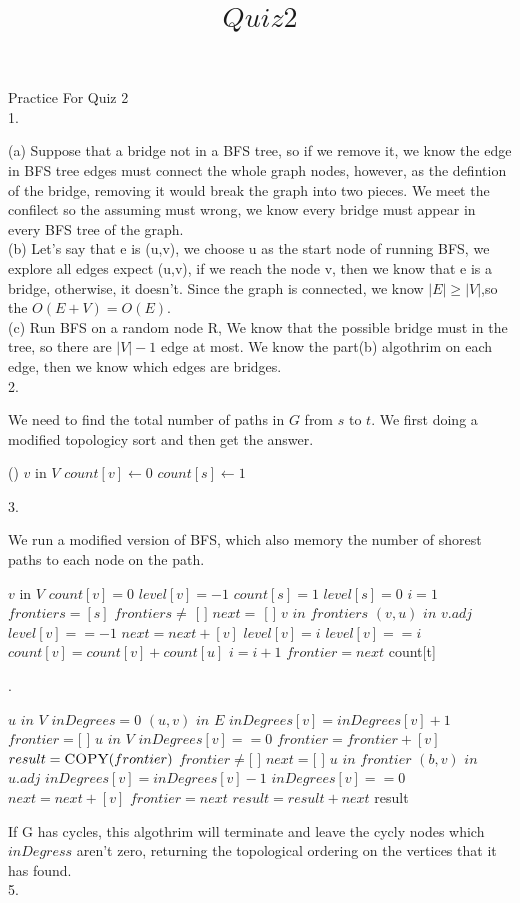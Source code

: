 \documentclass[12pt,twoside]{article}
\begin{document}
\title{$Quiz 2$}
Practice For Quiz 2\\
1.

(a) Suppose that a bridge not in a BFS tree, so if we remove it, we know the edge in BFS tree edges must connect the whole graph nodes, however, as the defintion of the bridge, removing it would break the graph into two pieces. We meet the confilect so the assuming must wrong, we know every bridge must appear in every BFS tree of the graph.\\
(b) Let's say that e is (u,v), we choose u as the start node of running BFS, we explore all edges expect (u,v), if we reach the node v, then we know that e is a bridge, otherwise, it doesn't. Since the graph is connected, we know $|E| \geq |V|$,so the $O(E+V)=O(E)$. \\
(c) Run BFS on a random node R, We know that the possible bridge must in the tree, so there are $|V|-1$ edge at most. We know the part(b) algothrim on each edge, then we know which edges are bridges.\\
2.

We need to find the total number of paths in $G$ from $s$ to $t$. We first doing a modified topologicy sort and then get the answer.
\begin{codebox}
\li {}()
\li \For $v$ in $V$ \Do
\li $count[v] \gets 0$ \End
\li $count[s] \gets 1$
\li 
\end{codebox}
\newpage

3.

We run a modified version of BFS, which also memory the number of shorest paths to each node on the path.
\begin{codebox}
\li \For $v$ in $V$ \Do
\li $count[v]=0$ 
\li $level[v]=-1$\End
\li $count[s]=1$
\li $level[s]=0$
\li $i=1$
\li $frontiers=[s]$
\li 
\li \While $frontiers\neq$ $[$ $]$ \Do
\li $next=$ $[$ $]$
\li \For $v$ $in$ $frontiers$ \Do 
\li \For $(v,u)$ $in$ $v.adj$ \Do 
\li \If $level[v]==-1$\Do
\li $next=next+[v]$ 
\li $level[v]=i$ \End
\li \If $level[v]==i$ \Do
\li $count[v]=count[v]+count[u]$
\li  \End \End \End 
\li $i=i+1$ 
\li $frontier=next$\End  
\li \Return count[t]
\end{codebox}
.

\begin{codebox}
\li \For $u$ $in$ $V$ \Do
\li $inDegrees=0$ \End
\li \For $(u,v)$ $in$ $E$ \Do
\li $inDegrees[v]=inDegrees[v]+1$ \End
\li $frontier=[$ $]$
\li \For $u$ $in$ $V$ \Do
\li \If $inDegrees[v]==0$ \Do 
\li $frontier=frontier+[v]$ \End \End
\li $result=\textnormal{\scshape COPY}(frontier)$
\li \While $frontier\neq [$ $]$ \Do
\li $next=[$ $]$
\li \For $u$ $in$ $frontier$ \Do 
\li \For $(b,v)$ $in$ $u.adj$ \Do 
\li $inDegrees[v]=inDegrees[v]-1$
\li \If $inDegrees[v]==0$ \Do
\li $next=next+[v]$ \End \End \End 
\li $frontier=next$
\li $result=result+next$\End
\li \Return result

\end{codebox}
If G has cycles, this algothrim will terminate and leave the cycly nodes which $inDegress$ aren't zero, returning the topological ordering on the vertices that it has found.\\
5.
\end{document}
